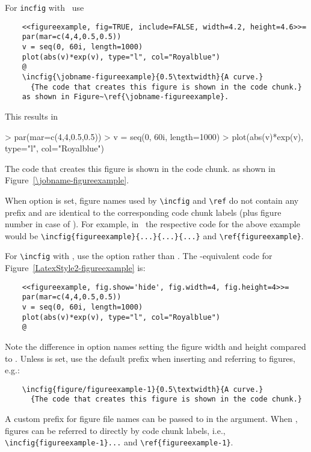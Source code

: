 \documentclass{article}
\newcommand\knitr{\Rpackage{knitr}}
\newcommand\Sweave{\software{Sweave}}
\begin{document}
For \verb+incfig+ with \Sweave\, use
\begin{verbatim}
    <<figureexample, fig=TRUE, include=FALSE, width=4.2, height=4.6>>=
    par(mar=c(4,4,0.5,0.5))
    v = seq(0, 60i, length=1000)
    plot(abs(v)*exp(v), type="l", col="Royalblue")
    @
    \incfig{\jobname-figureexample}{0.5\textwidth}{A curve.}
      {The code that creates this figure is shown in the code chunk.}
    as shown in Figure~\ref{\jobname-figureexample}.
\end{verbatim}
This results in
\begin{Schunk}
\begin{Sinput}
> par(mar=c(4,4,0.5,0.5))
> v = seq(0, 60i, length=1000)
> plot(abs(v)*exp(v), type="l", col="Royalblue")
\end{Sinput}
\end{Schunk}
  {The code that creates this figure is shown in the code chunk.}
as shown in Figure~\ref{\jobname-figureexample}.  

When option  is set, figure names used by
\verb+\incfig+ and \verb+\ref+ do not contain any prefix and are
identical to the corresponding code chunk labels (plus figure number in case of
\knitr). For example, in \Sweave\ the respective code for the above
example would be \verb+\incfig{figureexample}{...}{...}{...}+ and
\verb+\ref{figureexample}+.

For \verb+\incfig+ with \knitr, use the option
 rather than . The
\knitr-equivalent code for
Figure~\ref{LatexStyle2-figureexample} is:
\begin{verbatim}
    <<figureexample, fig.show='hide', fig.width=4, fig.height=4>>=
    par(mar=c(4,4,0.5,0.5))
    v = seq(0, 60i, length=1000)
    plot(abs(v)*exp(v), type="l", col="Royalblue")
    @
\end{verbatim}
Note the difference in option names setting the figure width and
height compared to \Sweave.  Unless
 is set, use the default 
prefix when inserting and referring to figures, e.g.:
\begin{verbatim}
    \incfig{figure/figureexample-1}{0.5\textwidth}{A curve.}
      {The code that creates this figure is shown in the code chunk.}
\end{verbatim}
A custom prefix for figure file names can be passed to
 in the  argument. When
, figures can be referred to directly by
code chunk labels, i.e., \verb+\incfig{figureexample-1}...+ and
\verb+\ref{figureexample-1}+.
\end{document}
